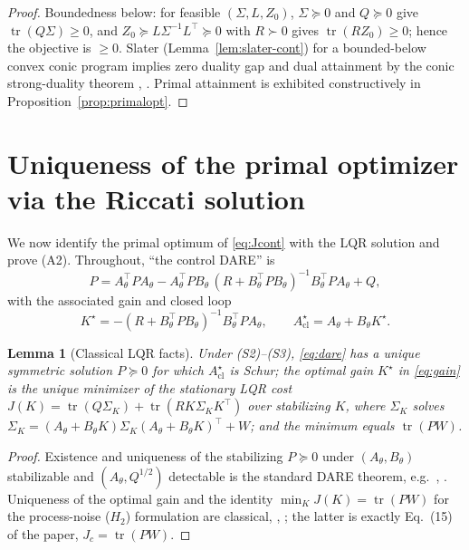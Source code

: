\documentclass[11pt]{article}
\newtheorem{lemma}{Lemma}
\theoremstyle{definition}
\DeclareMathOperator{\tr}{tr}
\newcommand{\Acl}{A_{\mathrm{cl}}}
\newcommand{\Th}{\theta}
\newcommand{\half}{{1/2}}
\newcommand{\Sig}{\Sigma}
\begin{document}
\begin{proof}
Boundedness below: for feasible $(\Sig,L,Z_0)$, $\Sig\succeq0$ and $Q\succeq0$
give $\tr(Q\Sig)\ge0$, and $Z_0\succeq L\Sig^{-1}L^\top\succeq0$ with $R\succ0$
gives $\tr(RZ_0)\ge0$; hence the objective is $\ge0$. Slater
(Lemma~\ref{lem:slater-cont}) for a bounded-below convex conic program implies
zero duality gap and dual attainment by the conic strong-duality theorem
\cite[Thm.~2.4.1]{BonnansShapiro}, \cite[\S5.9]{BoydVandenberghe}. Primal
attainment is exhibited constructively in Proposition~\ref{prop:primalopt}.
\end{proof}

\section{Uniqueness of the primal optimizer via the Riccati solution}\label{sec:riccati}

We now identify the primal optimum of \eqref{eq:Jcont} with the LQR solution and
prove (A2). Throughout, ``the control DARE'' is
\begin{equation}\label{eq:dare}
P=A_\Th^\top P A_\Th
-A_\Th^\top P B_\Th\,(R+B_\Th^\top P B_\Th)^{-1}B_\Th^\top P A_\Th+Q,
\end{equation}
with the associated gain and closed loop
\begin{equation}\label{eq:gain}
K^\star=-(R+B_\Th^\top P B_\Th)^{-1}B_\Th^\top P A_\Th,\qquad
\Acl^\star=A_\Th+B_\Th K^\star .
\end{equation}

\begin{lemma}[Classical LQR facts]\label{lem:dare}
Under \textup{(S2)}--\textup{(S3)}, \eqref{eq:dare} has a unique symmetric
solution $P\succeq0$ for which $\Acl^\star$ is Schur; the optimal gain $K^\star$
in \eqref{eq:gain} is the unique minimizer of the stationary LQR cost
$J(K)=\tr(Q\Sig_K)+\tr(RK\Sig_KK^\top)$ over stabilizing $K$, where $\Sig_K$
solves $\Sig_K=(A_\Th+B_\Th K)\Sig_K(A_\Th+B_\Th K)^\top+W$; and the minimum
equals $\tr(PW)$.
\end{lemma}

\begin{proof}
Existence and uniqueness of the stabilizing $P\succeq0$ under
$(A_\Th,B_\Th)$ stabilizable and $(A_\Th,Q^{\half})$ detectable is the standard
DARE theorem, e.g.\ \cite[Ch.~14--15]{LancasterRodman},
\cite[Ch.~6]{AndersonMoore}. Uniqueness of the optimal gain and the identity
$\min_K J(K)=\tr(PW)$ for the process-noise ($H_2$) formulation are classical,
\cite[Ch.~5]{AndersonMoore}, \cite[Ch.~3]{KwakernaakSivan}; the latter is exactly
Eq.~(15) of the paper, $J_c=\tr(PW)$.
\end{proof}
\end{document}
